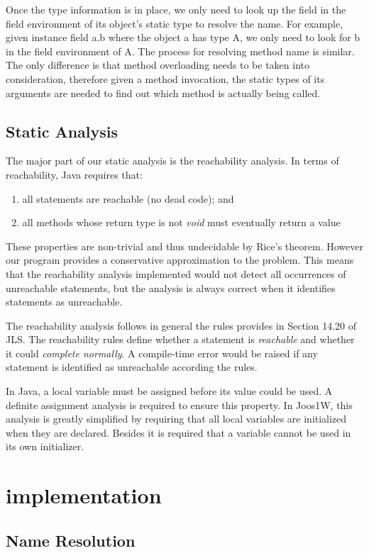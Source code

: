 \documentclass[a4paper, notitlepage]{report}
\begin{document}
Once the type information is in place, we only need to look up the field in the field environment of its object's static type to resolve the name. For example, given instance field a.b where the object a has type A, we only need to look for b in the field environment of A. The process for resolving method name is similar. The only difference is that method overloading needs to be taken into consideration, therefore given a method invocation, the static types of its arguments are needed to find out which method is actually being called.

\section{Static Analysis}

The major part of our static analysis is the reachability analysis. In terms of reachability, Java requires that:
\begin{enumerate}
\item all statements are reachable (no dead code); and 
\item all methods whose return type is not \emph{void} must eventually return a value
\end{enumerate}
These properties are non-trivial and thus undecidable by Rice's theorem. However our program provides a conservative approximation to the problem. This means that the reachability analysis implemented would not detect all occurrences of unreachable statements, but the analysis is always correct when it identifies statements as unreachable.

The reachability analysis follows in general the rules provides in Section 14.20 of JLS. The reachability rules define whether a statement is \emph{reachable} and whether it could \emph{complete normally}. A compile-time error would be raised if any statement is identified as unreachable according the rules.

In Java, a local variable must be assigned before its value could be used. A definite assignment analysis is required to ensure this property. In Joos1W, this analysis is greatly simplified by requiring that all local variables are initialized when they are declared. Besides it is required that a variable cannot be used in its own initializer.

\chapter{implementation}
\section{Name Resolution}
\end{document}
